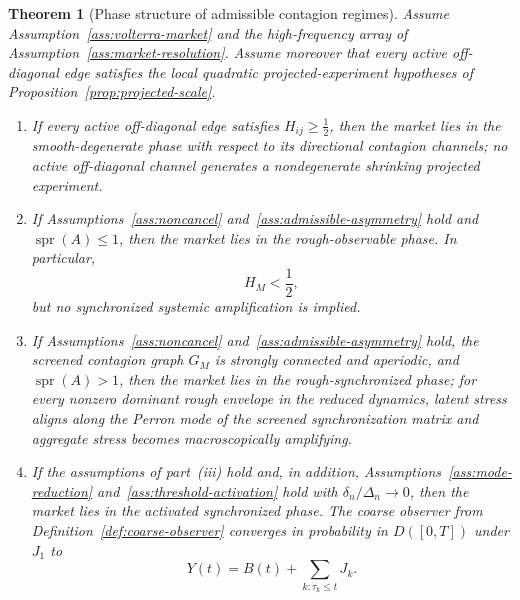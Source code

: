 \documentclass[11pt,a4paper]{amsart}
\theoremstyle{plain}
\newtheorem{theorem}{Theorem}[section]
\theoremstyle{definition}
\theoremstyle{remark}
\DeclareMathOperator{\spr}{spr}
\begin{document}
\begin{theorem}[Phase structure of admissible contagion regimes]\label{thm:market-phases}
Assume Assumption~\ref{ass:volterra-market} and the high-frequency array of
Assumption~\ref{ass:market-resolution}.  Assume moreover that every active off-diagonal edge
satisfies the local quadratic projected-experiment hypotheses of
Proposition~\ref{prop:projected-scale}.
\begin{enumerate}[label=(\roman*)]
\item If every active off-diagonal edge satisfies \(H_{ij}\ge \tfrac12\), then the market lies in
the smooth-degenerate phase with respect to its directional contagion channels; no active
off-diagonal channel generates a nondegenerate shrinking projected experiment.
\item If Assumptions~\ref{ass:noncancel} and~\ref{ass:admissible-asymmetry} hold and
\(\spr(A)\le 1\), then the market lies in the rough-observable phase.  In particular,
\[
        H_M<\frac12,
\]
but no synchronized systemic amplification is implied.
\item If Assumptions~\ref{ass:noncancel} and~\ref{ass:admissible-asymmetry} hold, the screened
contagion graph \(G_M\) is strongly connected and aperiodic, and \(\spr(A)>1\), then the market
lies in the rough-synchronized phase; for every nonzero dominant rough envelope in the reduced
dynamics, latent stress aligns along the Perron mode of the screened synchronization matrix and
aggregate stress becomes macroscopically amplifying.
\item If the assumptions of part~(iii) hold and, in addition, Assumptions~\ref{ass:mode-reduction}
and~\ref{ass:threshold-activation} hold with \(\delta_n/\Delta_n\to0\), then the market lies in
the activated synchronized phase.  The coarse observer from
Definition~\ref{def:coarse-observer} converges in probability in \(D([0,T])\) under \(J_1\) to
\[
        Y(t)=B(t)+\sum_{k:\tau_k\le t}J_k.
\]
\end{enumerate}
\end{theorem}
\end{document}
